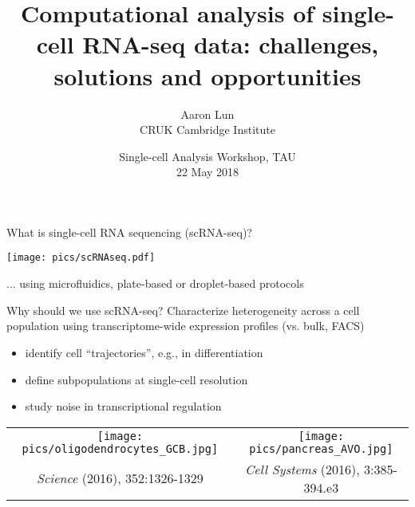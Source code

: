 \documentclass{beamer}
\title{Computational analysis of single-cell RNA-seq data: 
challenges, solutions and opportunities}
\author{Aaron Lun \\[0.1in]
\footnotesize{CRUK Cambridge Institute}
}
\date{
\footnotesize{Single-cell Analysis Workshop, TAU}\\[0.1in]
22 May 2018
}
\begin{document}
\maketitle

\begin{frame}{What is single-cell RNA sequencing (scRNA-seq)?}
\begin{center}
    \texttt{[image: pics/scRNAseq.pdf]}
\end{center}
... using microfluidics, plate-based or droplet-based protocols
\end{frame}

\begin{frame}{Why should we use scRNA-seq?}
    \vspace{0.1in}
    Characterize heterogeneity across a cell population using transcriptome-wide expression profiles (vs. bulk, FACS) \\[0.5em]
\begin{itemize}
    \setlength\itemsep{0.5em}
    \item identify cell ``trajectories'', e.g., in differentiation
    \item define subpopulations at single-cell resolution
    \item study noise in transcriptional regulation
\end{itemize}
\pause
\begin{center}
    \begin{tabular}{c c}
        \texttt{[image: pics/oligodendrocytes\_GCB.jpg]} &
        \texttt{[image: pics/pancreas\_AVO.jpg]} \\
        {\tiny \textit{Science} (2016), 352:1326-1329} &
        {\tiny \textit{Cell Systems} (2016), 3:385-394.e3} \\
\end{tabular}
\end{center}
\end{frame}
\end{document}

